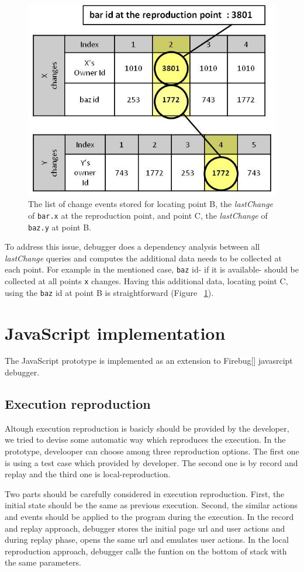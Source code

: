 \documentclass[preprint]{sigplanconf}
\begin{document}
\begin{figure}[htp]
\includegraphics[width=.48\textwidth]{8-lastchange-lastchange.jpg}
\caption{The list of change events stored for locating point B, the \textit{lastChange} of \texttt{bar.x} at the reproduction point, and point C, the \textit{lastChange} of  \texttt{baz.y} at point B.}
\label{fig:lastchange-lastchange}
\end{figure}

To address this issue, debugger does a dependency analysis between all \textit{lastChange} queries and computes the additional data needs to be collected at each point. For example in the mentioned case, \texttt{baz} id- if it is available- should be collected at all points \texttt{x} changes. Having this additional data, locating point C, using the \texttt{baz} id at point B is straightforward (Figure ~\ref{fig:lastchange-lastchange}).


\section{JavaScript implementation}
The JavaScript prototype is implemented as an extension to Firebug[] javasrcipt debugger. 

\subsection{Execution reproduction}
Altough execution reproduction is basicly should be provided by the developer, we tried to devise some automatic way which reproduces the execution. In the prototype, develooper can choose among three reproduction options. The first one is using a test case which provided by developer. The second one is by record and replay and the third one is local-reproduction.

Two parts should be carefully considered in execution reproduction. First, the initial state should be the same as previous execution. Second, the similar actions and events should be applied to the program during the execution. In the record and replay approach, debugger stores the initial page url and user actions and during replay phase, opens the same url and emulates user actions. 
In the local reproduction approach, debugger calls the funtion on the bottom of stack with the same parameters.
\end{document}
